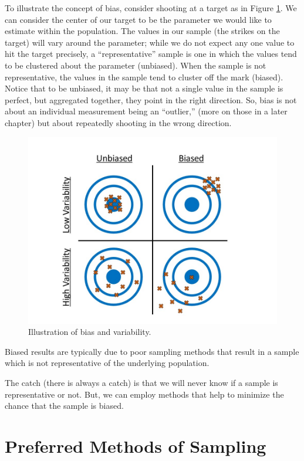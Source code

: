 \documentclass[]{book}
\theoremstyle{definition}
\theoremstyle{definition}
\theoremstyle{definition}
\theoremstyle{remark}
\let\BeginKnitrBlock\begin \let\EndKnitrBlock\end
\begin{document}
To illustrate the concept of bias, consider shooting at a target as in
Figure \ref{fig:data-bias}. We can consider the center of our target to
be the parameter we would like to estimate within the population. The
values in our sample (the strikes on the target) will vary around the
parameter; while we do not expect any one value to hit the target
precisely, a ``representative'' sample is one in which the values tend
to be clustered about the parameter (unbiased). When the sample is not
representative, the values in the sample tend to cluster off the mark
(biased). Notice that to be unbiased, it may be that not a single value
in the sample is perfect, but aggregated together, they point in the
right direction. So, bias is not about an individual measurement being
an ``outlier,'' (more on those in a later chapter) but about repeatedly
shooting in the wrong direction.

\begin{figure}

{\centering \includegraphics[width=0.8\linewidth]{./images/Data-Bias} 

}

\caption{Illustration of bias and variability.}\label{fig:data-bias}
\end{figure}

\BeginKnitrBlock{rmdkeyidea}
Biased results are typically due to poor sampling methods that result in
a sample which is not representative of the underlying population.
\EndKnitrBlock{rmdkeyidea}

The catch (there is always a catch) is that we will never know if a
sample is representative or not. But, we can employ methods that help to
minimize the chance that the sample is biased.

\section{Preferred Methods of
Sampling}\label{preferred-methods-of-sampling}
\end{document}
